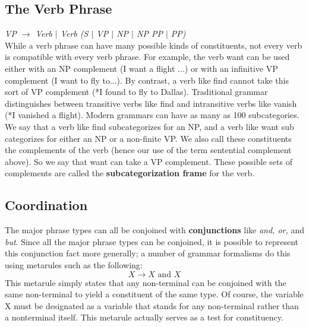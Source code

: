 \documentclass[11pt]{article}
\begin{document}
			\subsection*{The Verb Phrase}
				\textit{VP $\rightarrow$ Verb $|$ Verb (S $|$ VP $|$ NP $|$ NP PP $|$ PP)} \\
				While a verb phrase can have many possible kinds of constituents, not every verb is compatible with 
				every verb phrase. For example, the verb want can be used either with an NP complement 
				(I want a flight ...) or with an infinitive VP complement (I want to fly to...). By contrast, a verb like 
				find cannot take this sort of VP complement (*I found to fly to Dallas). Traditional grammar distinguishes
				between transitive verbs like find and intransitive verbs like vanish (*I vanished a flight). Modern grammars 
				can have as many as 100 subcategories. We say that a verb like find subcategorizes for an NP, and a verb 
				like want sub categorizes for either an NP or a non-finite VP. We also call these constituents the 
				complements of the verb (hence our use of the term sentential complement above). So we say that want 
				can take a VP complement. These possible sets of complements are called the 
				\textbf{subcategorization frame}  for the verb.
			
			\subsection*{Coordination}
				The major phrase types can all be conjoined with \textbf{conjunctions} like \textit{and, or, }
				and \textit{but}. Since all the major phrase types can be conjoined, it is  possible to represent this 
				conjunction fact more generally; a number of grammar formalisms do this using metarules such as the
				following:
				$$ X \rightarrow X \text{ and } X$$ 
				This metarule simply states that any non-terminal can be conjoined with the same non-terminal to yield a 
				constituent of the same type. Of course, the variable X must be designated as a variable that stands for any 
				non-terminal rather than a nonterminal itself. This metarule actually serves as a test for constituency. 
		
		
		
		
\end{document}
